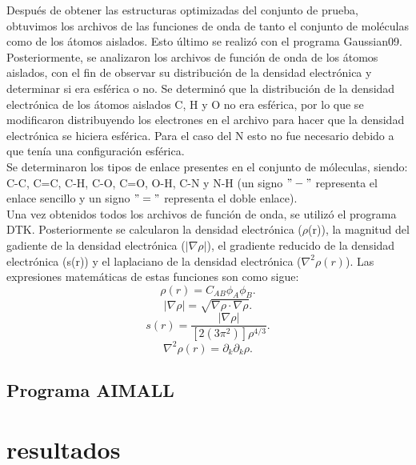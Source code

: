 \documentclass[12pt,letterpaper]{article}
\begin{document}
Después de obtener las estructuras optimizadas  del conjunto de prueba, obtuvimos los archivos de las funciones de  onda de tanto el conjunto de moléculas como de los átomos aislados. Esto último se realizó con el programa Gaussian09.\\
Posteriormente, se analizaron los archivos de función de onda de los átomos aislados, con el fin de observar su distribución de la densidad electrónica y determinar si era esférica o no. Se determinó que la distribución de la densidad electrónica de los átomos aislados C, H y O no era esférica, por lo que se modificaron distribuyendo los electrones en el archivo para hacer que la densidad electrónica se hiciera esférica. Para el caso del N esto no fue necesario debido a que tenía una configuración esférica.\\
Se determinaron los tipos de enlace presentes en el conjunto de móleculas, siendo: C-C, C=C, C-H, C-O, C=O, O-H, C-N y N-H (un signo $"-"$ representa el enlace sencillo y un signo $"="$ representa el doble enlace).\\ 
Una vez obtenidos todos los archivos de función de onda, se utilizó el programa DTK. Posteriormente se calcularon la densidad electrónica ($\rho$(r)), la magnitud del gadiente de la densidad electrónica ($|\nabla\rho|$), el gradiente reducido de la densidad electrónica (s(r)) y el laplaciano de la densidad electrónica ($\nabla^2\rho(r)$). Las expresiones matemáticas de estas funciones son como sigue:
\begin{equation}
\rho(r)=C_{AB}{\phi}_{A}{\phi}_{B}.
\end{equation}
\begin{equation}
 |\nabla\rho|=\sqrt{\nabla\rho\cdot\nabla\rho}.
\end{equation}
\begin{equation}
s(r)=\frac{|\nabla\rho|}{[2(3\pi^2)]\rho^{4/3}}.
\end{equation}
\begin{equation}
\nabla^2\rho(r)= \partial_{k}\partial_{k}\rho.
\end{equation}

\subsection{Programa AIMALL}

\section{resultados}
\end{document}
